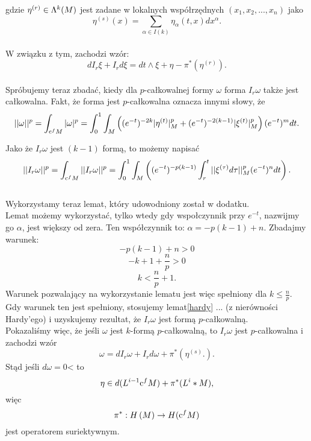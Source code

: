 \documentclass[licencjacka]{pracamgr}
\theoremstyle{definition}
\theoremstyle{definition}
\theoremstyle{plain}
\theoremstyle{plain}
\def\cfm{\ensuremath\mathrm{c}^fM}
\def\M{\ensuremath M}
\begin{document}
gdzie $\eta^{(r)} \in \Lambda^k (\M)$ jest zadane w lokalnych współrzędnych
$(x_1, x_2, ..., x_n)$ jako 
\[
    \eta^{(s)}(x) = \sum_{\alpha \in I(k)} \eta_\alpha(t, x) dx^\alpha.
\] \\

W związku z tym, zachodzi wzór:
\[
    d I_r \xi + I_r d \xi = dt \wedge \xi + \eta - \pi^\ast \left( \eta^{(r)} \right).
\] \\

Spróbujemy teraz zbadać, kiedy dla $p$-całkowalnej formy $\omega$ forma $I_r \omega$
także jest całkowalna. Fakt, że forma jest  $p$-całkowalna oznacza innymi słowy, że
\[
    || \omega ||^p = \int_{\cfm} |\omega|^p =
    \int_0^1 \int_{\M} \left(
        (e^{-t})^{-2k} | \eta^{(t)}|^p_{\M} + 
        (e^{-t})^{-2(k-1)} | \xi^{(t)}|^p_{\M} 
    \right)
    (e^{-t})^{m} dt.
\]

Jako że $I_r \omega$ jest $(k-1)$ formą, to możemy napisać
\[
    ||I_r \omega ||^p = 
    \int_{\cfm} ||I_r \omega||^p = 
    \int_0^1 \int_{\M} \left(
        (e^{-t})^{-p(k-1)}
        \int_r^t ||\xi^{(\tau)} d\tau||^p_{\M} (e^{-t})^n dt
    \right).
\] \\

Wykorzystamy teraz lemat, który udowodniony został w dodatku. \\

Lemat możemy wykorzystać, tylko wtedy gdy 
wspołczynnik przy $e^{-t}$, nazwijmy go $\alpha$, jest większy od zera. Ten współczynnik to:
$\alpha = -p(k-1) + n$. Zbadajmy warunek:
\[
    -p(k-1) + n > 0
\]
\[
    -k + 1 + \frac{n}{p} > 0
\]
\[
    k < \frac{n}{p} + 1.
\]
Warunek pozwalający na wykorzystanie lematu jest więc spełniony dla $k \leq \frac{n}{p}$. \\

Gdy warunek ten jest spełniony, stosujemy lemat\ref{hardy} ... (z nierówności Hardy'ego) i uzyskujemy rezultat, że $I_r \omega$
jest formą $p$-całkowalną. \\

Pokazaliśmy więc, że jeśli $\omega$ jest $k$-formą $p$-całkowalną, to  $I_r \omega$ jest
$p$-całkowalna i zachodzi wzór
\[
    \omega = dI_r \omega + I_r d \omega + \pi^\ast 
    \left(
        \eta^{(s)}.
    \right).
\]
Stąd jeśli $d \omega = 0$< to 
\[
    \eta \in d(L^{i-1} \cfm) + \pi^\ast (L^i*\M),
\]
więc 
\[
    \pi^\ast: H \left( \M \right) \rightarrow H ( \cfm )
\]
jest operatorem suriektywnym. \\

\end{document}
